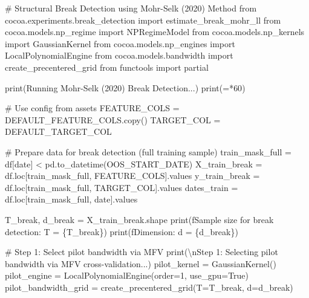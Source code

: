 \documentclass[
  letterpaper,
  DIV=11,
  numbers=noendperiod]{scrartcl}
\newenvironment{Shaded}{\begin{snugshade}}{\end{snugshade}}
\newcommand{\BuiltInTok}[1]{\textcolor[rgb]{0.00,0.23,0.31}{#1}}
\newcommand{\CharTok}[1]{\textcolor[rgb]{0.13,0.47,0.30}{#1}}
\newcommand{\CommentTok}[1]{\textcolor[rgb]{0.37,0.37,0.37}{#1}}
\newcommand{\DecValTok}[1]{\textcolor[rgb]{0.68,0.00,0.00}{#1}}
\newcommand{\ImportTok}[1]{\textcolor[rgb]{0.00,0.46,0.62}{#1}}
\newcommand{\NormalTok}[1]{\textcolor[rgb]{0.00,0.23,0.31}{#1}}
\newcommand{\OperatorTok}[1]{\textcolor[rgb]{0.37,0.37,0.37}{#1}}
\newcommand{\SpecialCharTok}[1]{\textcolor[rgb]{0.37,0.37,0.37}{#1}}
\newcommand{\SpecialStringTok}[1]{\textcolor[rgb]{0.13,0.47,0.30}{#1}}
\newcommand{\StringTok}[1]{\textcolor[rgb]{0.13,0.47,0.30}{#1}}
\newcommand{\VariableTok}[1]{\textcolor[rgb]{0.07,0.07,0.07}{#1}}
\begin{document}
\begin{Shaded}
\begin{Highlighting}[]
\CommentTok{\# Structural Break Detection using Mohr{-}Selk (2020) Method}
\ImportTok{from}\NormalTok{ cocoa.experiments.break\_detection }\ImportTok{import}\NormalTok{ estimate\_break\_mohr\_ll}
\ImportTok{from}\NormalTok{ cocoa.models.np\_regime }\ImportTok{import}\NormalTok{ NPRegimeModel}
\ImportTok{from}\NormalTok{ cocoa.models.np\_kernels }\ImportTok{import}\NormalTok{ GaussianKernel}
\ImportTok{from}\NormalTok{ cocoa.models.np\_engines }\ImportTok{import}\NormalTok{ LocalPolynomialEngine}
\ImportTok{from}\NormalTok{ cocoa.models.bandwidth }\ImportTok{import}\NormalTok{ create\_precentered\_grid}
\ImportTok{from}\NormalTok{ functools }\ImportTok{import}\NormalTok{ partial}

\BuiltInTok{print}\NormalTok{(}\StringTok{\textquotesingle{}Running Mohr{-}Selk (2020) Break Detection...\textquotesingle{}}\NormalTok{)}
\BuiltInTok{print}\NormalTok{(}\StringTok{\textquotesingle{}=\textquotesingle{}}\OperatorTok{*}\DecValTok{60}\NormalTok{)}

\CommentTok{\# Use config from assets}
\NormalTok{FEATURE\_COLS }\OperatorTok{=}\NormalTok{ DEFAULT\_FEATURE\_COLS.copy()}
\NormalTok{TARGET\_COL }\OperatorTok{=}\NormalTok{ DEFAULT\_TARGET\_COL}

\CommentTok{\# Prepare data for break detection (full training sample)}
\NormalTok{train\_mask\_full }\OperatorTok{=}\NormalTok{ df[}\StringTok{\textquotesingle{}date\textquotesingle{}}\NormalTok{] }\OperatorTok{\textless{}}\NormalTok{ pd.to\_datetime(OOS\_START\_DATE)}
\NormalTok{X\_train\_break }\OperatorTok{=}\NormalTok{ df.loc[train\_mask\_full, FEATURE\_COLS].values}
\NormalTok{y\_train\_break }\OperatorTok{=}\NormalTok{ df.loc[train\_mask\_full, TARGET\_COL].values}
\NormalTok{dates\_train }\OperatorTok{=}\NormalTok{ df.loc[train\_mask\_full, }\StringTok{\textquotesingle{}date\textquotesingle{}}\NormalTok{].values}

\NormalTok{T\_break, d\_break }\OperatorTok{=}\NormalTok{ X\_train\_break.shape}
\BuiltInTok{print}\NormalTok{(}\SpecialStringTok{f\textquotesingle{}Sample size for break detection: T = }\SpecialCharTok{\{}\NormalTok{T\_break}\SpecialCharTok{\}}\SpecialStringTok{\textquotesingle{}}\NormalTok{)}
\BuiltInTok{print}\NormalTok{(}\SpecialStringTok{f\textquotesingle{}Dimension: d = }\SpecialCharTok{\{}\NormalTok{d\_break}\SpecialCharTok{\}}\SpecialStringTok{\textquotesingle{}}\NormalTok{)}

\CommentTok{\# Step 1: Select pilot bandwidth via MFV}
\BuiltInTok{print}\NormalTok{(}\StringTok{\textquotesingle{}}\CharTok{\textbackslash{}n}\StringTok{Step 1: Selecting pilot bandwidth via MFV cross{-}validation...\textquotesingle{}}\NormalTok{)}
\NormalTok{pilot\_kernel }\OperatorTok{=}\NormalTok{ GaussianKernel()}
\NormalTok{pilot\_engine }\OperatorTok{=}\NormalTok{ LocalPolynomialEngine(order}\OperatorTok{=}\DecValTok{1}\NormalTok{, use\_gpu}\OperatorTok{=}\VariableTok{True}\NormalTok{)}
\NormalTok{pilot\_bandwidth\_grid }\OperatorTok{=}\NormalTok{ create\_precentered\_grid(T}\OperatorTok{=}\NormalTok{T\_break, d}\OperatorTok{=}\NormalTok{d\_break)}


\end{Highlighting}
\end{Shaded}
\end{document}
